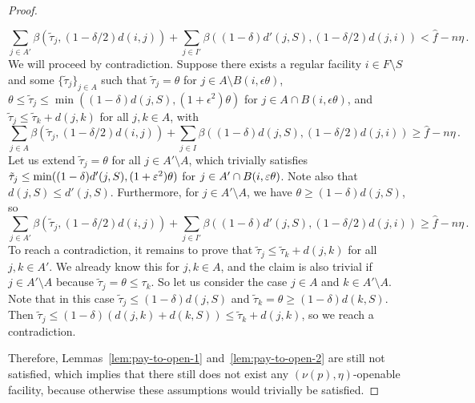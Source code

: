 \begin{proof}
\begin{itemize}
    \[\sum_{j \in A'} \beta(\tilde\tau_j, (1-\delta/2)d(i,j)) + \sum_{j \in I'} \beta((1-\delta)d'(j, S), (1-\delta/2)d(j,i)) < \hat{f} - n \eta\,.\]
    We will proceed by contradiction. 
    Suppose there exists a regular facility $i \in F \setminus S$ and some $\{\tilde{\tau}_j\}_{j \in A}$ such that $\tilde{\tau}_j = \theta$ for $j \in A \setminus B(i, \epsilon \theta)$, $\theta \leq \tilde{\tau}_j \leq \min((1-\delta)d(j,S), (1+\epsilon^2)\theta)$ for $j \in A \cap B(i, \epsilon \theta)$, and $\tilde{\tau}_j \leq \tilde{\tau}_k + d(j, k)$ for all $j, k \in A$, with
    \[\sum_{j \in A} \beta(\tilde\tau_j, (1-\delta/2)d(i,j)) + \sum_{j \in I} \beta((1-\delta)d(j, S), (1-\delta/2)d(j,i)) \geq \hat{f} - n \eta\,.\]
    Let us extend $\tilde\tau_j = \theta$ for all $j \in A' \setminus A$, which trivially satisfies $\tilde\tau_j \leq \min((1-\delta) d'(j, S), (1+\varepsilon^2)\theta)$ for $j \in A' \cap B(i, \varepsilon \theta)$.
    Note also that $d(j, S) \leq d'(j, S)$.
    Furthermore, for $j \in A' \setminus A$, we have $\theta \geq (1-\delta)d(j,S)$, so
    \[\sum_{j \in A'} \beta(\tilde\tau_j, (1-\delta/2)d(i,j)) + \sum_{j \in I'} \beta((1-\delta)d'(j, S), (1-\delta/2)d(j,i)) \geq \hat{f} - n \eta\,.\]
    To reach a contradiction, it remains to prove that $\tilde\tau_j \leq \tilde\tau_k + d(j,k)$ for all $j, k \in A'$.
    We already know this for $j, k \in A$, and the claim is also trivial if $j \in A' \setminus A$ because $\tilde\tau_j = \theta \leq \tau_k$.
    So let us consider the case $j \in A$ and $k \in A' \setminus A$.
    Note that in this case $\tilde\tau_j \leq (1-\delta) d(j,S)$ and $\tilde\tau_k = \theta \geq (1-\delta) d(k, S)$.
    Then $\tilde\tau_j \leq (1-\delta) (d(j,k)+d(k,S)) \leq \tilde\tau_k + d(j,k)$, so we reach a contradiction.
\end{itemize}
Therefore, Lemmas~\ref{lem:pay-to-open-1} and~\ref{lem:pay-to-open-2} are still not satisfied, which implies that there still does not exist any $(\nu(p),\eta)$-openable facility, because otherwise these assumptions would trivially be satisfied.
\end{proof}